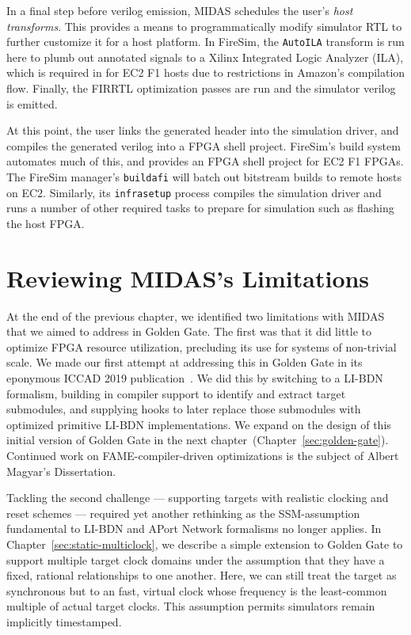 In a final step before verilog emission, MIDAS schedules the user's
\emph{host transforms}.  This provides a means to programmatically modify simulator RTL to further
customize it for a host platform. In FireSim, the \texttt{AutoILA}
transform is run here to plumb out annotated signals to a Xilinx Integrated
Logic Analyzer (ILA), which is required in for EC2 F1 hosts due to
restrictions in Amazon's compilation flow. Finally, the FIRRTL optimization passes are run
and the simulator verilog is emitted.

At this point, the user links the generated header into the simulation
driver, and compiles the generated verilog into a FPGA shell project.
FireSim's build system automates much of this, and provides an FPGA shell
project for EC2 F1 FPGAs. The FireSim manager's \texttt{buildafi} will batch
out bitstream builds to remote hosts on EC2. Similarly, its
\texttt{infrasetup} process compiles the simulation driver and runs a number of
other required tasks to prepare for simulation such as flashing the host FPGA.

\section{Reviewing MIDAS's Limitations}

At the end of the previous chapter, we identified two limitations with MIDAS
that we aimed to address in Golden Gate. The first was that it did little to
optimize FPGA resource utilization, precluding its use for systems of
non-trivial scale. We made our first attempt at addressing this in Golden Gate
in its eponymous ICCAD 2019 publication~\cite{GoldenGate}. We did this by
switching to a LI-BDN formalism, building in compiler support to identify and
extract target submodules, and supplying hooks to later replace those
submodules with optimized primitive LI-BDN implementations. We expand on the
design of this initial version of Golden Gate in the next
chapter~(Chapter~\ref{sec:golden-gate}). Continued work on FAME-compiler-driven
optimizations is the subject of Albert Magyar's Dissertation.

Tackling the second challenge --- supporting targets
with realistic clocking and reset schemes --- required yet another
rethinking as the SSM-assumption fundamental to LI-BDN and APort Network
formalisms no longer applies. In Chapter~\ref{sec:static-multiclock}, we
describe a simple extension to Golden Gate to support multiple target clock
domains under the assumption that they have a fixed, rational relationships to one another.
Here, we can still treat the target as synchronous but to an
fast, virtual clock whose frequency is the least-common multiple
of actual target clocks. This assumption permits simulators remain implicitly
timestamped.

